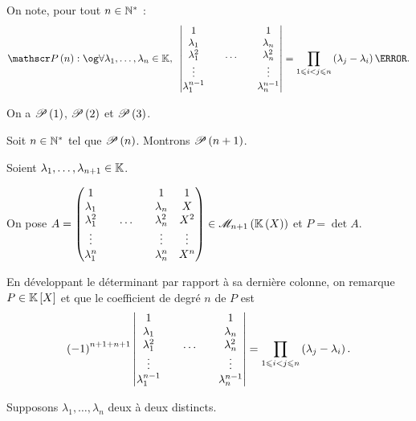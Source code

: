 \begin{dem}
On note, pour tout \(n\in\Ns\) : \[\P{n}:\text{\og}\quantifs{\forall\lambda_1,\dots,\lambda_n\in\K}\begin{vmatrix}
1               &  &       &  & 1               \\
\lambda_1       &  &       &  & \lambda_n       \\
\lambda_1^2     &  & \dots &  & \lambda_n^2     \\
\vdots          &  &       &  & \vdots          \\
\lambda_1^{n-1} &  &       &  & \lambda_n^{n-1} \\
\end{vmatrix}=\prod_{1\leq i<j\leq n}\paren{\lambda_j-\lambda_i}\text{\fg{}}.\]

On a \(\P{1}\), \(\P{2}\) et \(\P{3}\).

Soit \(n\in\Ns\) tel que \(\P{n}\). Montrons \(\P{n+1}\).

Soient \(\lambda_1,\dots,\lambda_{n+1}\in\K\).

On pose \(A=\begin{pmatrix}
1           &  &       &  & 1           & 1      \\
\lambda_1   &  &       &  & \lambda_n   & X      \\
\lambda_1^2 &  & \dots &  & \lambda_n^2 & X^2    \\
\vdots      &  &       &  & \vdots      & \vdots \\
\lambda_1^n &  &       &  & \lambda_n^n & X^n    \\
\end{pmatrix}\in\M{n+1}[\fracrat]\) et \(P=\det A\).

En développant le déterminant par rapport à sa dernière colonne, on remarque \(P\in\poly\) et que le coefficient de degré \(n\) de \(P\) est \[\paren{-1}^{n+1+n+1}\begin{vmatrix}
1               &  &       &  & 1               \\
\lambda_1       &  &       &  & \lambda_n       \\
\lambda_1^2     &  & \dots &  & \lambda_n^2     \\
\vdots          &  &       &  & \vdots          \\
\lambda_1^{n-1} &  &       &  & \lambda_n^{n-1} \\
\end{vmatrix}=\prod_{1\leq i<j\leq n}\paren{\lambda_j-\lambda_i}.\]

Supposons \(\lambda_1,\dots,\lambda_n\) deux à deux distincts.


\end{dem}
